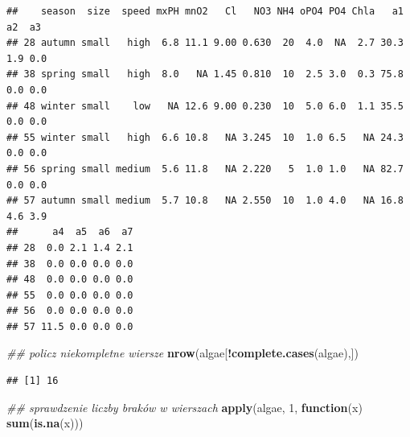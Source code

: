 \documentclass[]{book}
\newenvironment{Shaded}{\begin{snugshade}}{\end{snugshade}}
\newcommand{\CommentTok}[1]{\textcolor[rgb]{0.56,0.35,0.01}{\textit{#1}}}
\newcommand{\ControlFlowTok}[1]{\textcolor[rgb]{0.13,0.29,0.53}{\textbf{#1}}}
\newcommand{\DecValTok}[1]{\textcolor[rgb]{0.00,0.00,0.81}{#1}}
\newcommand{\KeywordTok}[1]{\textcolor[rgb]{0.13,0.29,0.53}{\textbf{#1}}}
\newcommand{\NormalTok}[1]{#1}
\newcommand{\OperatorTok}[1]{\textcolor[rgb]{0.81,0.36,0.00}{\textbf{#1}}}
\newcommand{\StringTok}[1]{\textcolor[rgb]{0.31,0.60,0.02}{#1}}
\theoremstyle{plain}
\theoremstyle{definition}
\theoremstyle{definition}
\theoremstyle{definition}
\theoremstyle{definition}
\theoremstyle{remark}
\begin{document}
\begin{Shaded}
\end{Shaded}

\begin{verbatim}
##    season  size  speed mxPH mnO2   Cl   NO3 NH4 oPO4 PO4 Chla   a1  a2  a3
## 28 autumn small   high  6.8 11.1 9.00 0.630  20  4.0  NA  2.7 30.3 1.9 0.0
## 38 spring small   high  8.0   NA 1.45 0.810  10  2.5 3.0  0.3 75.8 0.0 0.0
## 48 winter small    low   NA 12.6 9.00 0.230  10  5.0 6.0  1.1 35.5 0.0 0.0
## 55 winter small   high  6.6 10.8   NA 3.245  10  1.0 6.5   NA 24.3 0.0 0.0
## 56 spring small medium  5.6 11.8   NA 2.220   5  1.0 1.0   NA 82.7 0.0 0.0
## 57 autumn small medium  5.7 10.8   NA 2.550  10  1.0 4.0   NA 16.8 4.6 3.9
##      a4  a5  a6  a7
## 28  0.0 2.1 1.4 2.1
## 38  0.0 0.0 0.0 0.0
## 48  0.0 0.0 0.0 0.0
## 55  0.0 0.0 0.0 0.0
## 56  0.0 0.0 0.0 0.0
## 57 11.5 0.0 0.0 0.0
\end{verbatim}

\begin{Shaded}
\begin{Highlighting}[]
\CommentTok{## policz niekompletne wiersze}
\KeywordTok{nrow}\NormalTok{(algae[}\OperatorTok{!}\KeywordTok{complete.cases}\NormalTok{(algae),])}
\end{Highlighting}
\end{Shaded}

\begin{verbatim}
## [1] 16
\end{verbatim}

\begin{Shaded}
\begin{Highlighting}[]
\CommentTok{## sprawdzenie liczby braków w wierszach}
\KeywordTok{apply}\NormalTok{(algae, }\DecValTok{1}\NormalTok{, }\ControlFlowTok{function}\NormalTok{(x) }\KeywordTok{sum}\NormalTok{(}\KeywordTok{is.na}\NormalTok{(x)))}
\end{Highlighting}
\end{Shaded}
\end{document}
